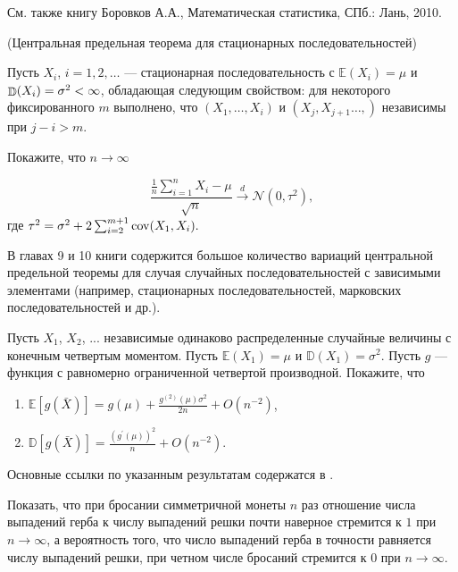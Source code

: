 \begin{remark}
См. также книгу Боровков А.А., Математическая статистика, СПб.: Лань, 2010.
\end{remark}

\begin{problem}(Центральная предельная теорема для стационарных последовательностей)

Пусть $X_i$, $i=1,2,\dots$ --- стационарная последовательность с $\mathbb{E}(X_i)=\mu$ и $\mathop{\mathbb{D}}\nolimits (X_i) = \sigma^2<\infty$, обладающая  следующим свойством: для некоторого фиксированного $m$ выполнено, что $(X_1,\dots,X_i)$ и $(X_j,X_{j+1}\dots,)$ независимы при $j-i>m$.

Покажите, что $n\to\infty$

$$
\frac{\frac{1}{n}\sum_{i=1}^n X_i-\mu}{\sqrt{n}}\overset{d}{\to} \mathcal{N}(0,\tau^2),
$$
где $\tau^2 = \sigma^2+2\sum_{i=2}^{m+1}{\rm cov}(X_1,X_i).$

\end{problem}
\begin{remark}
В главах 9 и 10 книги \cite{Gupta} содержится большое количество вариаций центральной предельной теоремы для случая случайных  последовательностей с зависимыми элементами (например, стационарных последовательностей, марковских последовательностей и др.).
\end{remark}

\begin{problem}
Пусть $X_1$, $X_2$, ... независимые одинаково распределенные случайные величины с конечным четвертым моментом. Пусть $\mathbb{E}(X_1)=\mu$ и $\mathbb{D}(X_1)=
\sigma^2$. Пусть $g$ --- функция с равномерно ограниченной четвертой производной. Покажите, что 
\begin{enumerate}
\item $\mathbb{E}[g(\bar{X})] = g(\mu)+\frac{g^{(2)}(\mu)\sigma^2}{2n}+O(n^{-2})$, 
\item
$\mathbb{D}[g(\bar{X})] = \frac{(g^{\prime}(\mu))^2}{n}+O(n^{-2}).$
\end{enumerate}
\end{problem}
\begin{remark}
Основные ссылки по указанным результатам содержатся в \cite{Gupta}.
\end{remark}

\begin{problem}

Показать, что при бросании симметричной монеты $n$ раз отношение числа выпадений герба к числу выпадений решки почти наверное стремится 
к $1$ при $n\to\infty$, а вероятность того, что число выпадений герба в точности равняется числу выпадений решки, при четном числе 
бросаний стремится к $0$ при $n\to\infty$. 
\end{problem}

